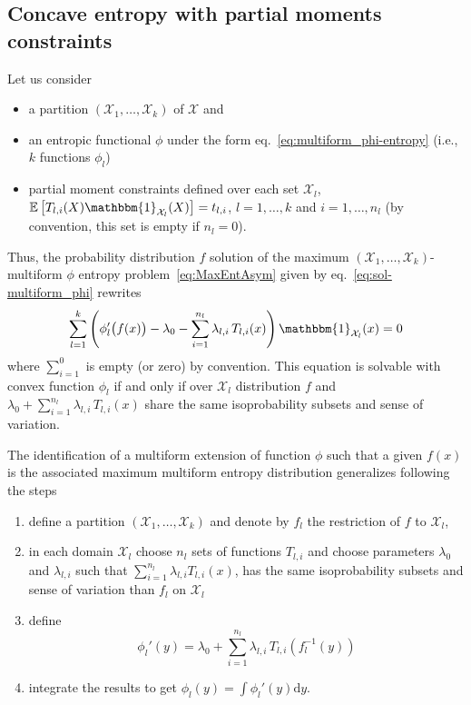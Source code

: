 \documentclass[english,sort&compress]{elsarticle}
\theoremstyle{definition}
\theoremstyle{plain}
\theoremstyle{plain}
\def\d{\mathrm{d}}
\def\X{\mathcal{X}}
\def\un{\mathbbm{1}}
\newcommand{\Esp}[1]{\mathbb{E}\left[ #1 \right]}
\begin{document}
\subsection{Concave entropy with partial moments constraints}
\label{subsec:ConcaveMultiPhiEnt}

Let us consider 
%
\begin{itemize}
\item a partition $(\X_1,\ldots,\X_k)$ of $\X$ and 
\item     an      entropic     functional     $\phi$      under     the     form
  eq.~\eqref{eq:multiform_phi-entropy} (i.e., $k$ functions $\phi_l$)
\item partial moment constraints  defined over each set $\X_l$, $\Esp{T_{l,i}(X)
    \un_{\X_l}(X)} = t_{l,i}$, $l = 1 , \ldots , k$ and $i = 1 , \ldots , n_l$
  (by convention, this set is empty if $n_l = 0$).
\end{itemize}
%
Thus,   the    probability   distribution   $f$   solution    of   the   maximum
$(\X_1,\ldots,\X_k)$-multiform   $\phi$   entropy  problem~\eqref{eq:MaxEntAsym}
given by eq.~\eqref{eq:sol-multiform_phi} rewrites
%
\begin{equation}\label{eq:sol-multiform_phi_concave}
\sum_{l=1}^k \left( \phi_l'\big(f(x)\big) - \lambda_0 - \sum_{i=1}^{n_l}
\lambda_{l,i}\, T_{l,i}(x) \right) \un_{\X_l}(x) = 0
\end{equation}
%
where  $\displaystyle \sum_{i=1}^0$  is  empty (or  zero)  by convention.   This
equation is  solvable with convex function  $\phi_l$ if and only  if over $\X_l$
distribution $f$ and $\displaystyle \lambda_0 + \sum_{i=1}^{n_l} \lambda_{l,i}\,
T_{l,i}(x)$ share the same isoprobability subsets and sense of variation.

The identification of a multiform extension of function $\phi$ such that a given
$f(x)$  is the  associated  maximum multiform  entropy distribution  generalizes
following the steps
%
\begin{enumerate}
\item  define a  partition $(\X_1  , \ldots  , \X_k)$  and denote  by  $f_l$ the
  restriction of $f$ to $\X_l$,
\item in each domain $\X_l$ choose  $n_l$ sets of functions $T_{l,i}$ and choose
  parameters   $\lambda_0$   and   $\lambda_{l,i}$  such   that   $\displaystyle
  \sum_{i=1}^{n_l} \lambda_{l,i}T_{l,i}(x)$, has the same isoprobability subsets
  and sense of variation than $f_l$ on $\X_l$
\item define
  \begin{equation}\label{eq:derivative-phil-concave}
    \phi_l'(y) = \lambda_0 + \sum_{i=1}^{n_l} \lambda_{l,i} \,
    T_{l,i}\!\left(f_l^{-1}(y)\right)
  \end{equation}
\item integrate the  results to get ${\displaystyle \phi_l(y)  = \int \phi_l'(y)
    \d y}$.
\end{enumerate}
\end{document}
